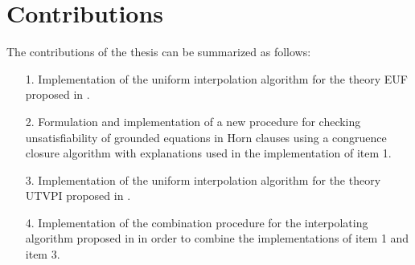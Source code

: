 \section{Contributions}

The contributions of the thesis can be summarized as follows:

\begin{itemize}
  \item[1.] Implementation of the uniform 
    interpolation algorithm for the theory EUF 
    proposed in \cite{KAPUR2017}.
  \item[2.] Formulation and implementation of a new 
    procedure for checking unsatisfiability of 
    grounded equations in 
    Horn clauses using a congruence closure 
    algorithm with explanations
    used in the implementation of item 1.
  \item[3.] Implementation of the uniform 
    interpolation algorithm for the theory UTVPI
    proposed in \cite{KAPUR2017}.
  \item[4.] Implementation of the combination 
    procedure for the interpolating
    algorithm proposed in 
    \cite{10.1007/11532231_26} in order to 
    combine the implementations of item 1 and item 3.
\end{itemize}

